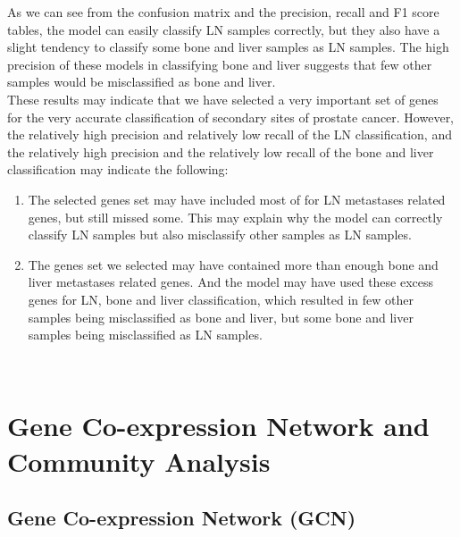 \documentclass[12pt,a4paper]{report}
\begin{document}
As we can see from the confusion matrix and the precision, recall and F1 score tables, the model can easily classify LN samples correctly, but they also have a slight tendency to classify some bone and liver samples as LN samples. The high precision of these models in classifying bone and liver suggests that few other samples would be misclassified as bone and liver.\\

These results may indicate that we have selected a very important set of genes for the very accurate classification of secondary sites of prostate cancer. However, the relatively high precision and relatively low recall of the LN classification, and the relatively high precision and the relatively low recall of the bone and liver classification may indicate the following:


\begin{enumerate}[\hspace{3em}a.]
\item The selected genes set may have included most of for LN metastases related genes, but still missed some. This may explain why the model can correctly classify LN samples but also misclassify other samples as LN samples. 

\item The genes set we selected may have contained more than enough bone and liver  metastases related genes. And the model may have used these excess genes for LN, bone and liver classification, which resulted in few other samples being misclassified as bone and liver, but some bone and liver samples being misclassified as LN samples.\\

\end{enumerate}\\


\chapter{Gene Co-expression Network and Community Analysis}
\section{Gene Co-expression Network (GCN)}
\end{document}
